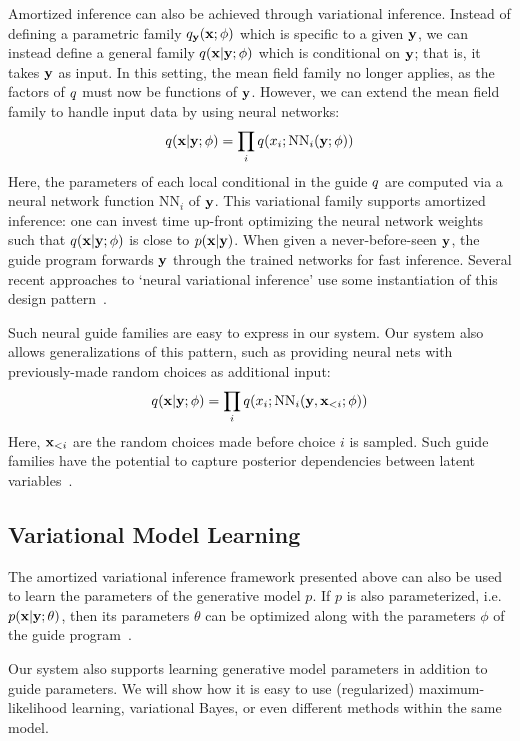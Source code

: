 Amortized inference can also be achieved through variational inference.
Instead of defining a parametric family $q_{\mathbf{y}}(\mathbf{x} ; \phi)$ which is specific to a given $\mathbf{y}$, we can instead define a general family $q(\mathbf{x} | \mathbf{y} ; \phi)$ which is conditional on $\mathbf{y}$; that is, it takes $\mathbf{y}$ as input.
In this setting, the mean field family no longer applies, as the factors of $q$ must now be functions of $\mathbf{y}$.
However, we can extend the mean field family to handle input data by using neural networks:
\begin{equation*}
q(\mathbf{x} | \mathbf{y} ; \phi) = \prod_i q(x_i ; \text{NN}_i(\mathbf{y} ; \phi))
\end{equation*}
Here, the parameters of each local conditional in the guide $q$ are computed via a neural network function $\text{NN}_i$ of $\mathbf{y}$.
This variational family supports amortized inference: one can invest time up-front optimizing the neural network weights such that $q(\mathbf{x} | \mathbf{y} ; \phi)$ is close to $p(\mathbf{x} | \mathbf{y})$. When given a never-before-seen $\mathbf{y}$, the guide program forwards $\mathbf{y}$ through the trained networks for fast inference.
Several recent approaches to `neural variational inference' use some instantiation of this design pattern~\cite{NVIL,DLGM,AEVB}.

Such neural guide families are easy to express in our system. Our system also allows generalizations of this pattern, such as providing neural nets with previously-made random choices as additional input:
\begin{equation*}
q(\mathbf{x} | \mathbf{y} ; \phi) = \prod_i q(x_i ; \text{NN}_i(\mathbf{y}, \mathbf{x}_{<i} ; \phi))
\end{equation*}
Here, $\mathbf{x}_{<i}$ are the random choices made before choice $i$ is sampled. Such guide families have the potential to capture posterior dependencies between latent variables~.

\subsection{Variational Model Learning}

The amortized variational inference framework presented above can also be used to learn the parameters of the generative model $p$. If $p$ is also parameterized, i.e. $p(\mathbf{x} | \mathbf{y} ; \theta)$, then its parameters $\theta$ can be optimized along with the parameters $\phi$ of the guide program~\cite{NVIL,DLGM,AEVB}.

Our system also supports learning generative model parameters in addition to guide parameters.
We will show how it is easy to use (regularized) maximum-likelihood learning, variational Bayes, or even different methods within the same model.

